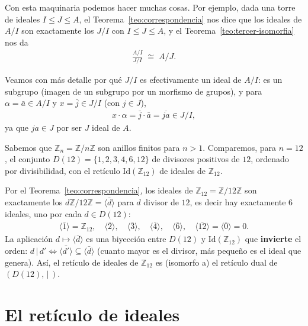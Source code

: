 Con esta maquinaria podemos hacer muchas cosas. Por ejemplo, dada una torre de ideales $I \leq J \leq A$, el Teorema~\ref{teo:correspondencia} nos dice que los ideales de $A/I$ son exactamente los $J/I$ con $I\leq J\leq A$, y el Teorema~\ref{teo:tercer-isomorfia} nos da
\begin{gather*}
    \frac{A/I}{J/I} \;\cong\; A/J.
\end{gather*}

Veamos con más detalle por qué $J/I$ es efectivamente un ideal de $A/I$: es un subgrupo (imagen de un subgrupo por un morfismo de grupos), y para $\alpha=\bar a \in A/I$ y $x=\bar j\in J/I$ (con $j\in J$),
\begin{gather*}
    x\cdot \alpha = \bar{j}\cdot \bar{a} = \overline{ja} \in J/I,
\end{gather*}
ya que $ja \in J$ por ser $J$ ideal de $A$.

\begin{ejemplo}
Sabemos que $\mathbb{Z}_n=\mathbb{Z}/n\mathbb{Z}$ son anillos finitos para $n>1$. Comparemos, para $n=12$, el conjunto $D(12)=\{1,2,3,4,6,12\}$ de divisores positivos de $12$, ordenado por divisibilidad, con el retículo $\mathrm{Id}(\mathbb{Z}_{12})$ de ideales de $\mathbb{Z}_{12}$.

Por el Teorema~\ref{teo:correspondencia}, los ideales de $\mathbb{Z}_{12}=\mathbb{Z}/12\mathbb{Z}$ son exactamente los $d\mathbb{Z}/12\mathbb{Z} = \langle \bar d\rangle$ para $d$ divisor de $12$, es decir hay exactamente $6$ ideales, uno por cada $d\in D(12)$:
\begin{gather*}
    \langle \bar 1\rangle = \mathbb{Z}_{12}, \quad \langle \bar 2\rangle,\quad \langle \bar 3\rangle,\quad \langle \bar 4\rangle,\quad \langle \bar 6\rangle,\quad \langle\bar{12}\rangle=\langle \bar 0\rangle=0.
\end{gather*}
La aplicación $d\mapsto \langle \bar d\rangle$ es una biyección entre $D(12)$ y $\mathrm{Id}(\mathbb{Z}_{12})$ que \textbf{invierte} el orden: $d\,|\,d' \iff \langle \bar{d'}\rangle \subseteq \langle \bar d\rangle$ (cuanto mayor es el divisor, más pequeño es el ideal que genera). Así, el retículo de ideales de $\mathbb{Z}_{12}$ es (isomorfo a) el retículo dual de $(D(12), \,|\,)$.
\end{ejemplo}

\section{El retículo de ideales}

